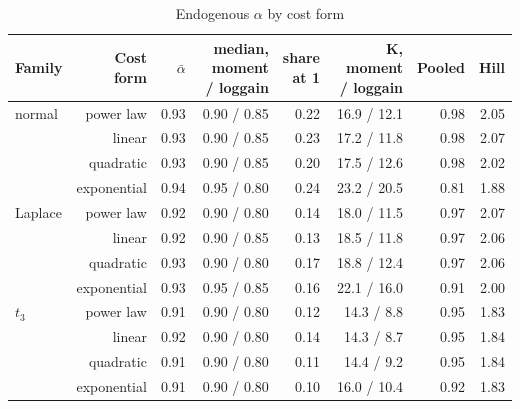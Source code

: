 \begin{table}
\centering
\caption{Endogenous $\alpha$ by cost form}
\label{tab:a13_endogenous}
\small
\begin{tabular}{lrrrrrrr}
\toprule
Family & Cost form & $\bar\alpha$ & \makecell[b]{median,\\{}moment / loggain} & \makecell[b]{share\\{}at 1} & \makecell[b]{K,\\{}moment / loggain} & Pooled & Hill \\
\midrule
normal & power law & 0.93 & 0.90 / 0.85 & 0.22 & 16.9 / 12.1 & 0.98 & 2.05 \\
 & linear & 0.93 & 0.90 / 0.85 & 0.23 & 17.2 / 11.8 & 0.98 & 2.07 \\
 & quadratic & 0.93 & 0.90 / 0.85 & 0.20 & 17.5 / 12.6 & 0.98 & 2.02 \\
 & exponential & 0.94 & 0.95 / 0.80 & 0.24 & 23.2 / 20.5 & 0.81 & 1.88 \\
Laplace & power law & 0.92 & 0.90 / 0.80 & 0.14 & 18.0 / 11.5 & 0.97 & 2.07 \\
 & linear & 0.92 & 0.90 / 0.85 & 0.13 & 18.5 / 11.8 & 0.97 & 2.06 \\
 & quadratic & 0.93 & 0.90 / 0.80 & 0.17 & 18.8 / 12.4 & 0.97 & 2.06 \\
 & exponential & 0.93 & 0.95 / 0.85 & 0.16 & 22.1 / 16.0 & 0.91 & 2.00 \\
$t_3$ & power law & 0.91 & 0.90 / 0.80 & 0.12 & 14.3 / 8.8 & 0.95 & 1.83 \\
 & linear & 0.92 & 0.90 / 0.80 & 0.14 & 14.3 / 8.7 & 0.95 & 1.84 \\
 & quadratic & 0.91 & 0.90 / 0.80 & 0.11 & 14.4 / 9.2 & 0.95 & 1.84 \\
 & exponential & 0.91 & 0.90 / 0.80 & 0.10 & 16.0 / 10.4 & 0.92 & 1.83 \\
\bottomrule
\end{tabular}
\end{table}
